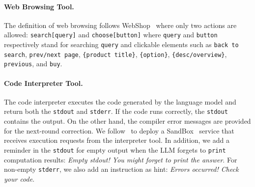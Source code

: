 \documentclass[]{youtu} %
\begin{document}
\paragraph{Web Browsing Tool.} The definition of web browsing follows WebShop~\cite{yao2022webshop} where only two actions are allowed: \texttt{search[query]} and \texttt{choose[button]} where \texttt{query} and \texttt{button} respectively stand for searching \texttt{query} and clickable elements such as \texttt{back to search}, \texttt{prev/next page}, \texttt{\{product title\}}, \texttt{\{option\}}, \texttt{\{desc/overview\}}, \texttt{previous}, and \texttt{buy}.


\paragraph{Code Interpreter Tool.} The code interpreter executes the code generated by the language model and return both the \texttt{stdout} and \texttt{stderr}. If the code runs correctly, the \texttt{stdout} contains the output. On the other hand, the compiler error messages are provided for the next-round correction. We follow~\cite{feng2025retool} to deploy a SandBox~\cite{bytedanceseedfoundationcodeteam2025fullstackbenchevaluatingllms} service that receives execution requests from the interpreter tool. In addition, we add a reminder in the \texttt{stdout} for empty output when the LLM forgets to \texttt{print} computation results: \textit{Empty stdout! You might forget to print the answer}. For non-empty \texttt{stderr}, we also add an instruction as hint: \textit{Errors occurred! Check your code}.




\end{document}
